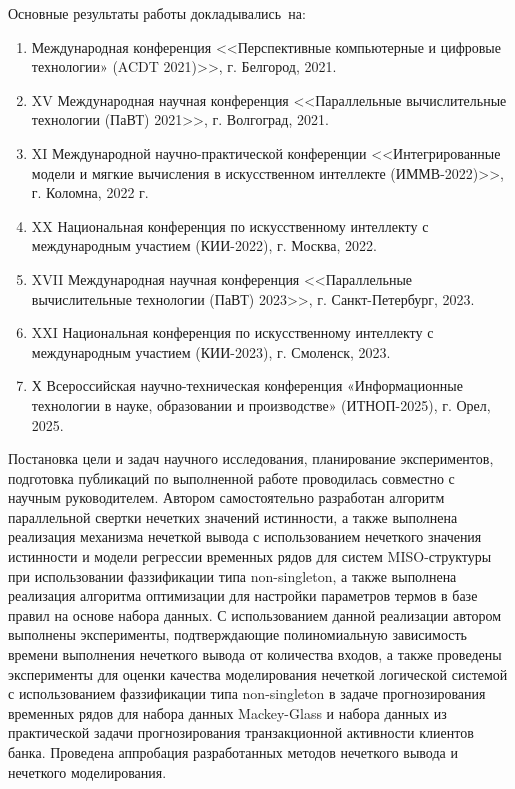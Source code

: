 {\probation}
Основные результаты работы докладывались~на:
\begin{enumerate}
	\item Международная конференция <<Перспективные компьютерные и цифровые технологии» (ACDT 2021)>>, г. Белгород, 2021.
	\item XV Международная научная конференция <<Параллельные вычислительные технологии (ПаВТ) 2021>>, г. Волгоград, 2021.
	\item XI Международной научно-практической конференции <<Интегрированные модели и мягкие вычисления в искусственном интеллекте (ИММВ-2022)>>, г. Коломна, 2022 г.
	\item XX Национальная конференция по искусственному интеллекту с международным участием (КИИ-2022), г. Москва, 2022.
	\item XVII Международная научная конференция <<Параллельные вычислительные технологии (ПаВТ) 2023>>, г. Санкт-Петербург, 2023.
	\item XXI Национальная конференция по искусственному интеллекту с международным участием (КИИ-2023), г. Смоленск, 2023.
	\item Х Всероссийская научно-техническая конференция «Информационные технологии в науке, образовании и производстве» (ИТНОП-2025), г. Орел, 2025.
\end{enumerate}

{\contribution} Постановка цели и задач научного исследования, планирование экспериментов, подготовка публикаций по выполненной работе проводилась совместно с научным руководителем. Автором самостоятельно разработан алгоритм параллельной свертки нечетких значений истинности, а также выполнена реализация механизма нечеткой вывода с использованием нечеткого значения истинности и модели регрессии временных рядов для систем MISO-структуры при использовании фаззификации типа non-singleton, а также выполнена реализация алгоритма оптимизации для настройки параметров термов в базе правил на основе набора данных. С использованием данной реализации автором выполнены эксперименты, подтверждающие полиномиальную зависимость времени выполнения нечеткого вывода от количества входов, а также проведены эксперименты для оценки качества моделирования нечеткой логической системой с использованием фаззификации типа non-singleton в задаче прогнозирования временных рядов для набора данных Mackey-Glass и набора данных из практической задачи прогнозирования транзакционной активности клиентов банка. Проведена аппробация разработанных методов нечеткого вывода и нечеткого моделирования.

